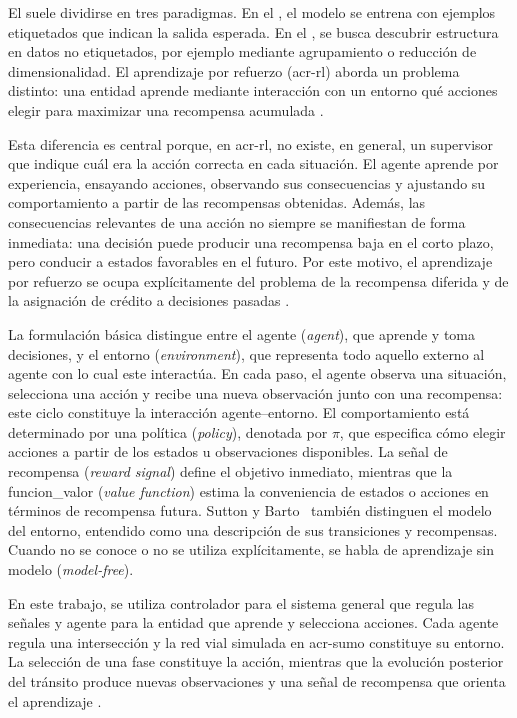El  suele dividirse en tres paradigmas. En el , el modelo se entrena con ejemplos etiquetados que indican la salida esperada. En el , se busca descubrir estructura en datos no etiquetados, por ejemplo mediante agrupamiento o reducción de dimensionalidad. El aprendizaje por refuerzo (\acrshort{acr-rl}) aborda un problema distinto: una entidad aprende mediante interacción con un entorno qué acciones elegir para maximizar una recompensa acumulada \cite{suttonRL}.

Esta diferencia es central porque, en \acrshort{acr-rl}, no existe, en general, un supervisor que indique cuál era la acción correcta en cada situación. El agente aprende por experiencia, ensayando acciones, observando sus consecuencias y ajustando su comportamiento a partir de las recompensas obtenidas. Además, las consecuencias relevantes de una acción no siempre se manifiestan de forma inmediata: una decisión puede producir una recompensa baja en el corto plazo, pero conducir a estados favorables en el futuro. Por este motivo, el aprendizaje por refuerzo se ocupa explícitamente del problema de la recompensa diferida y de la asignación de crédito a decisiones pasadas \cite{suttonRL}.

La formulación básica distingue entre el agente (\textit{agent}), que aprende y toma decisiones, y el entorno (\textit{environment}), que representa todo aquello externo al agente con lo cual este interactúa. En cada paso, el agente observa una situación, selecciona una acción y recibe una nueva observación junto con una recompensa: este ciclo constituye la interacción agente--entorno. El comportamiento está determinado por una política (\textit{policy}), denotada por $\pi$, que especifica cómo elegir acciones a partir de los estados u observaciones disponibles. La señal de recompensa (\textit{reward signal}) define el objetivo inmediato, mientras que la \gls{funcion_valor} (\textit{value function}) estima la conveniencia de estados o acciones en términos de recompensa futura. Sutton y Barto~\cite{suttonRL} también distinguen el modelo del entorno, entendido como una descripción de sus transiciones y recompensas. Cuando no se conoce o no se utiliza explícitamente, se habla de aprendizaje sin modelo (\textit{model-free}).

En este trabajo, se utiliza controlador para el sistema general que regula las señales y agente para la entidad que aprende y selecciona acciones. Cada agente regula una intersección y la red vial simulada en \acrshort{acr-sumo} constituye su entorno. La selección de una fase constituye la acción, mientras que la evolución posterior del tránsito produce nuevas observaciones y una señal de recompensa que orienta el aprendizaje \cite{lopez2018sumo}.

